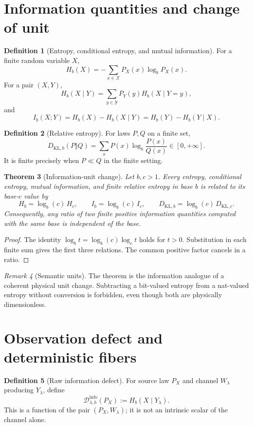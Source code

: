 \documentclass[11pt,a4paper]{article}
\theoremstyle{definition}
\newtheorem{definition}{Definition}[section]
\theoremstyle{plain}
\newtheorem{theorem}[definition]{Theorem}
\theoremstyle{remark}
\newtheorem{remark}[definition]{Remark}
\newcommand{\X}{\mathcal{X}}
\newcommand{\Y}{\mathcal{Y}}
\newcommand{\1}{\mathbf{1}}
\newcommand{\KLb}{D_{\mathrm{KL},b}}
\newcommand{\Hb}{H_b}
\newcommand{\Ib}{I_b}
\newcommand{\Dinfo}{\mathscr{D}^{\mathrm{info}}}
\begin{document}
\section{Information quantities and change of unit}

\begin{definition}[Entropy, conditional entropy, and mutual information]
For a finite random variable $X$,
\[
\Hb(X)=-\sum_{x\in\X}P_X(x)\log_b P_X(x).
\]
For a pair $(X,Y)$,
\[
\Hb(X\mid Y)
=
\sum_{y\in\Y}P_Y(y)\Hb(X\mid Y=y),
\]
and
\[
\Ib(X;Y)
=
\Hb(X)-\Hb(X\mid Y)
=
\Hb(Y)-\Hb(Y\mid X).
\]
\end{definition}

\begin{definition}[Relative entropy]
For laws $P,Q$ on a finite set,
\[
\KLb(P\Vert Q)
=
\sum_xP(x)\log_b\frac{P(x)}{Q(x)}
\in[0,+\infty].
\]
It is finite precisely when $P\ll Q$ in the finite setting.
\end{definition}

\begin{theorem}[Information-unit change]
\label{thm:base-change}
Let $b,c>1$. Every entropy, conditional entropy, mutual information, and
finite relative entropy in base $b$ is related to its base-$c$ value by
\[
\Hb=\log_b(c)\,H_c,\qquad
\Ib=\log_b(c)\,I_c,\qquad
D_{\mathrm{KL},b}=\log_b(c)\,D_{\mathrm{KL},c}.
\]
Consequently, any ratio of two finite positive information quantities
computed with the same base is independent of the base.
\end{theorem}

\begin{proof}
The identity $\log_b t=\log_b(c)\log_c t$ holds for $t>0$.
Substitution in each finite sum gives the first three relations. The common
positive factor cancels in a ratio.
\end{proof}

\begin{remark}[Semantic units]
The theorem is the information analogue of a coherent physical unit
change. Subtracting a bit-valued entropy from a nat-valued entropy without
conversion is forbidden, even though both are physically dimensionless.
\end{remark}

\section{Observation defect and deterministic fibers}

\begin{definition}[Raw information defect]
For source law $P_X$ and channel $W_\lambda$ producing $Y_\lambda$, define
\[
\Dinfo_{\lambda,b}(P_X)
:=
\Hb(X\mid Y_\lambda).
\]
This is a function of the pair $(P_X,W_\lambda)$; it is not an intrinsic
scalar of the channel alone.
\end{definition}
\end{document}
